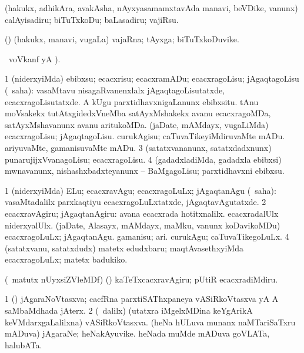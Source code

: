 \bentry
{} 
\gl{\akirx}
\expl{}
\bmng
(hakukx, adhikAra, avakAsha, nAyxyasamamxtavAda manavi, beVDike, \mo vanunx) calAyisadiru; biTuTxkoDu; baLasadiru; vajiRsu. 
\emng
\eentry

\bentry
{} 
\gl{\nA}
\expl{}
\bmng
(\nAyxshA) (hakukx, manavi, \mo vugaLa) vajaRna; tAyxga; biTuTxkoDuvike. 
\emng
\eentry

\bentry
{} 
\gl{\kirx}
  \ucAcx\ voVkanf yA ). 

\noindent
\gl{\sakirx}
\expl{}
\bmng
\bnum
\num{1} (niderxyiMda) ebibxsu; ecacxrisu; ecacxramADu; ecacxragoLisu; jAgaqtagoLisu (\rUpa\ saha):  vasaMtavu nisagaRvanenxlalx jAgaqtagoLisutatxde, ecacxragoLisutatxde.  A kUgu parxtidhavxnigaLanunx ebibxsitu.  tAnu moVsakekx tutAtxgidedxVneMba satAyxMshakekx avanu ecacxragoMDa, satAyxMshavanunx avanu aritukoMDa. 
 (jaDate, mAMdayx, \mo vugaLiMda) 
\banum
{} ecacxragoLisu; jAgaqtagoLisu. 
 curukAgisu; caTuvaTikeyiMdiruvaMte mADu. 
 ariyuvaMte, gamanisuvaMte mADu. 
\eanum
\numie
\num{3} (satatxvananunx, satatxdadxnunx) punarujijxVvanagoLisu; ecacxragoLisu. 
\num{4} (gadadxladiMda, gadadxla ebibxsi) mwnavanunx, nishashxbadxteyanunx -- BaMgagoLisu; parxtidhavxni ebibxsu. 
\enum
\emng

\noindent
\gl{\akirx}
\expl{}
\bmng
\bnum
\num{1} (niderxyiMda) ELu; ecacxravAgu; ecacxragoLuLx; jAgaqtanAgu (\rUpa\ saha):  vasaMtadalilx parxkaqtiyu ecacxragoLuLxtatxde, jAgaqtavAgutatxde. 
\num{2} ecacxravAgiru; jAgaqtanAgiru:  avana ecacxrada hotitxnalilx.  ecacxradalUlx niderxyalUlx. 
 (jaDate, Alasayx, mAMdayx, maMku, \mo vanunx koDavikoMDu) 
\banum
{} ecacxragoLuLx; jAgaqtanAgu. 
 gamanisu; ari. 
 curukAgu; caTuvaTikegoLuLx. 
\eanum
\numie
\num{4} (satatxvanu, satatxdudx) matetx edudxbaru; maqtAvasethxyiMda ecacxragoLuLx; matetx badukiko. 
\enum
\emng

\noindent 
\gl{\pagu}
\expl{}
\bmng
{} (\AseTxrXV\ matutx nUyxsiZVleMDf) (\anw) kaTeTxcacxravAgiru; pUtiR ecacxradiMdiru. 
\emng
\eentry

\bentry
{} 
\gl{\nA}
\expl{}
\bmng
\bnum
\num{1} (\ca) jAgaraNoVtasxva; cacfRna parxtiSAThxpaneya vASiRkoVtasxva yA A saMbaMdhada jAterx. 
\num{2} (\sA\ \bava dalilx) (utatxra iMgelxMDina keYgArikA keVMdarxgaLalilxna) vASiRkoVtasxva. 
 (heNa hULuva munanx naMTariSaTxru mADuva) 
\banum
{} jAgaraNe; heNakAyuvike. 
 heNada muMde mADuva goVLATa, halubATa. 
\eanum
\numie
\enum
\emng
\eentry

